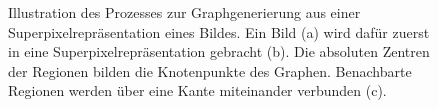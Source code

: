 \begin{figure}[t]
\centering
{}
\caption[Graphgenerierung aus einer Superpixelrepräsentation]{Illustration des Prozesses zur Graphgenerierung aus einer Superpixelrepräsentation eines Bildes.
Ein Bild (a) wird dafür zuerst in eine Superpixelrepräsentation gebracht (b).
Die absoluten Zentren der Regionen bilden die Knotenpunkte des Graphen.
Benachbarte Regionen werden über eine Kante miteinander verbunden (c).}
\label{fig:superpixel_graph}
\end{figure}
